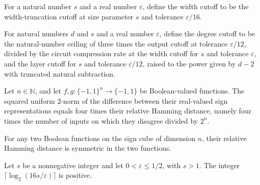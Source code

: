 \begin{definition}
\label{FABL.lmnWidthCutoff}
\leanok
{}
For a natural number $s$ and a real number $\varepsilon$, define the width cutoff to be
the width-truncation cutoff at size parameter $s$ and tolerance $\varepsilon/16$.
\end{definition}

\begin{definition}
\label{FABL.lmnDegreeCutoff}
\leanok
{}
For natural numbers $d$ and $s$ and a real number $\varepsilon$, define the degree
cutoff to be the natural-number ceiling of three times the output cutoff at tolerance
$\varepsilon/12$, divided by the circuit compression rate at the width cutoff for $s$
and tolerance $\varepsilon$, and the layer cutoff for $s$ and tolerance
$\varepsilon/12$, raised to the power given by $d-2$ with truncated natural subtraction.
\end{definition}

\begin{theorem}
\label{FABL.uniformLpNorm_sub_toReal_sq_eq_four_mul_relativeHammingDist}
\leanok
{}
Let $n\in\mathbb{N}$, and let $f,g:\{-1,1\}^n\to\{-1,1\}$ be Boolean-valued functions.
The squared uniform $2$-norm of the difference between their real-valued sign
representations equals four times their relative Hamming distance, namely four times the
number of inputs on which they disagree divided by $2^n$.
\end{theorem}

\begin{theorem}
\label{FABL.relativeHammingDist_comm}
\leanok
{}
For any two Boolean functions on the sign cube of dimension $n$, their relative Hamming
distance is symmetric in the two functions.
\end{theorem}

\begin{theorem}
\label{FABL.lmnWidthCutoff_pos}
\leanok
{}
Let $s$ be a nonnegative integer and let $0<\varepsilon\le 1/2$, with $s>1$. The integer
$\lceil\log_2(16s/\varepsilon)\rceil$ is positive.
\end{theorem}

